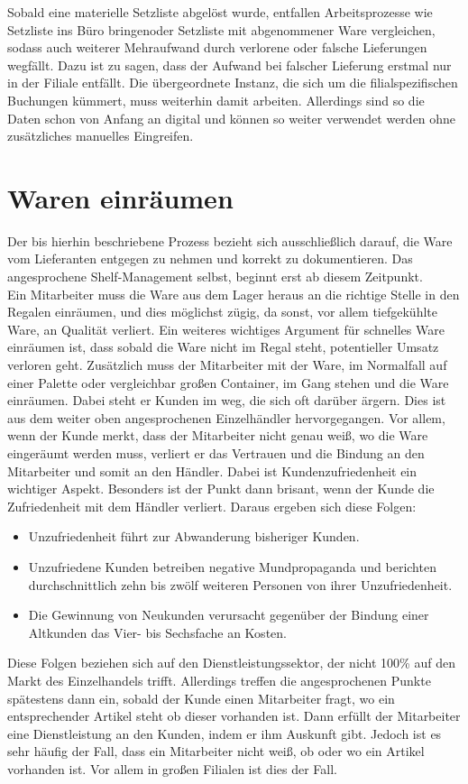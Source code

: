 Sobald eine materielle Setzliste abgelöst wurde, entfallen Arbeitsprozesse wie \glqq Setzliste ins Büro bringen\grqq oder \glqq Setzliste mit abgenommener Ware vergleichen\grqq, sodass auch weiterer Mehraufwand durch verlorene oder falsche Lieferungen wegfällt. Dazu ist zu sagen, dass der Aufwand bei falscher Lieferung erstmal nur in der Filiale entfällt. Die übergeordnete Instanz, die sich um die filialspezifischen Buchungen kümmert, muss weiterhin damit arbeiten. Allerdings sind so die Daten schon von Anfang an digital und können so weiter verwendet werden ohne zusätzliches manuelles Eingreifen.

\section{Waren einräumen}
\label{waren_einräumen}
Der bis hierhin beschriebene Prozess bezieht sich ausschließlich darauf, die Ware vom Lieferanten entgegen zu nehmen und korrekt zu dokumentieren. Das angesprochene Shelf-Management selbst, beginnt erst ab diesem Zeitpunkt.\\

Ein Mitarbeiter muss die Ware aus dem Lager heraus an die richtige Stelle in den Regalen einräumen, und dies möglichst zügig, da sonst, vor allem tiefgekühlte Ware, an Qualität verliert. Ein weiteres wichtiges Argument für schnelles Ware einräumen ist, dass sobald die Ware nicht im Regal steht, potentieller Umsatz verloren geht. Zusätzlich muss der Mitarbeiter mit der Ware, im Normalfall auf einer Palette oder vergleichbar großen Container, im Gang stehen und die Ware einräumen. Dabei steht er Kunden im weg, die sich oft darüber ärgern. Dies ist aus dem weiter oben angesprochenen Einzelhändler hervorgegangen. Vor allem, wenn der Kunde merkt, dass der Mitarbeiter nicht genau weiß, wo die Ware eingeräumt werden muss, verliert er das Vertrauen und die Bindung an den Mitarbeiter und somit an den Händler. Dabei ist Kundenzufriedenheit ein wichtiger Aspekt. Besonders ist der Punkt dann brisant, wenn der Kunde die Zufriedenheit mit dem Händler verliert. Daraus ergeben sich diese Folgen:
\begin{itemize}
	\item Unzufriedenheit führt zur Abwanderung bisheriger Kunden.
	\item Unzufriedene Kunden betreiben negative Mundpropaganda und berichten durchschnittlich zehn bis zwölf weiteren Personen von ihrer Unzufriedenheit.
	\item Die Gewinnung von Neukunden verursacht gegenüber der Bindung einer Altkunden das Vier- bis Sechsfache an Kosten.
\end{itemize}
Diese Folgen beziehen sich auf den Dienstleistungssektor, der nicht 100\% auf den Markt des Einzelhandels trifft. Allerdings treffen die angesprochenen Punkte spätestens dann ein, sobald der Kunde einen Mitarbeiter fragt, wo ein entsprechender Artikel steht \bzw ob dieser vorhanden ist. Dann erfüllt der Mitarbeiter eine Dienstleistung an den Kunden, indem er ihm Auskunft gibt. Jedoch ist es sehr häufig der Fall, dass ein Mitarbeiter nicht weiß, ob oder wo ein Artikel vorhanden ist. Vor allem in großen Filialen ist dies der Fall.\\


